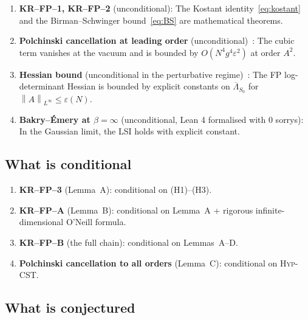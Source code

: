 \documentclass[11pt,a4paper]{amsart}
\theoremstyle{definition}
\theoremstyle{remark}
\newcommand{\norm}[1]{\left\lVert#1\right\rVert}
\begin{document}
\begin{enumerate}[leftmargin=2.5em]
\item \textbf{KR--FP--1, KR--FP--2} (unconditional): The Kostant
      identity~\eqref{eq:kostant} and the Birman--Schwinger
      bound~\eqref{eq:BS} are mathematical theorems.

\item \textbf{Polchinski cancellation at leading order}
      (unconditional)~\cite{RemondiereClayClosure}: The cubic term vanishes
      at the vacuum and is bounded by $O(N^4 g^4 \varepsilon^2)$ at order
      $A^2$.

\item \textbf{Hessian bound} (unconditional in the perturbative
      regime)~\cite{RemondiereFPHess}: The FP log-determinant Hessian is
      bounded by explicit constants on $\overline{\Lambda}_{S_0}$ for
      $\norm{A}_{L^\infty} \leq \varepsilon(N)$.

\item \textbf{Bakry--\'Emery at $\beta = \infty$} (unconditional, Lean 4
      formalised with 0 sorrys): In the Gaussian limit, the LSI holds with
      explicit constant.
\end{enumerate}

\subsection{What is conditional}

\begin{enumerate}[leftmargin=2.5em]
\item \textbf{KR--FP--3} (Lemma~A): conditional on (H1)--(H3).
\item \textbf{KR--FP--A} (Lemma~B): conditional on Lemma~A + rigorous
      infinite-dimensional O'Neill formula.
\item \textbf{KR--FP--B} (the full chain): conditional on Lemmas~A--D.
\item \textbf{Polchinski cancellation to all orders} (Lemma~C):
      conditional on \textsc{Hyp-CST}.
\end{enumerate}

\subsection{What is conjectured}
\end{document}

